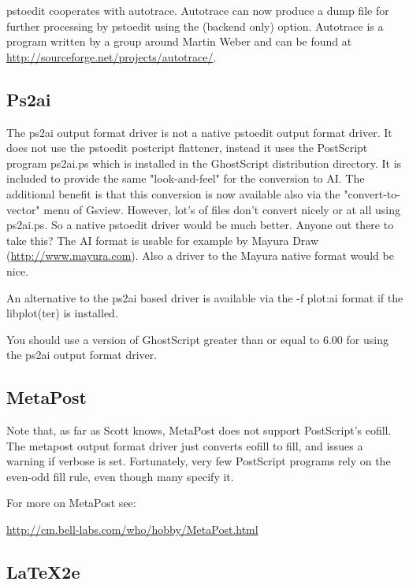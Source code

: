 \documentclass[english,a4paper]{article}
\let\URL\url \let\Email\url \let\File\url
\begin{document}
	pstoedit cooperates with autotrace. Autotrace can now produce a dump file 
	for further processing by pstoedit using the  (backend only) option. 
	Autotrace is a program written by a group around Martin Weber and can be 
	found at \URL{http://sourceforge.net/projects/autotrace/}.

  \subsection{Ps2ai}

    The ps2ai output format driver is not a native pstoedit output format driver. It does not use the
    pstoedit postcript flattener, instead it uses the PostScript program
    ps2ai.ps which is installed in the GhostScript distribution directory. It
    is included  to provide the same "look-and-feel" for the conversion to AI.
    The additional benefit is that this conversion is now available also via
    the "convert-to-vector" menu of Gsview. However, lot's of files don't
    convert nicely or at all using ps2ai.ps. So a native pstoedit driver would
    be much better. Anyone out there to take this? The AI format is usable for
    example by Mayura Draw (\URL{http://www.mayura.com}). Also a driver to the
    Mayura native format would be nice. 

    An alternative to the ps2ai based driver is available via the -f plot:ai format if the libplot(ter) is installed.

    You should use a version of GhostScript greater than or equal to 6.00 for using the ps2ai output format driver.


  \subsection{MetaPost}

    Note that, as far as Scott knows, MetaPost does not support PostScript's
    eofill. The metapost output format driver just converts eofill to fill, and issues a warning if
    verbose is set. Fortunately, very few PostScript programs rely on the
    even-odd fill rule, even though many specify it.

    For more on MetaPost see: 
    
    \URL{http://cm.bell-labs.com/who/hobby/MetaPost.html}

  \subsection{LaTeX2e} 
\end{document}

